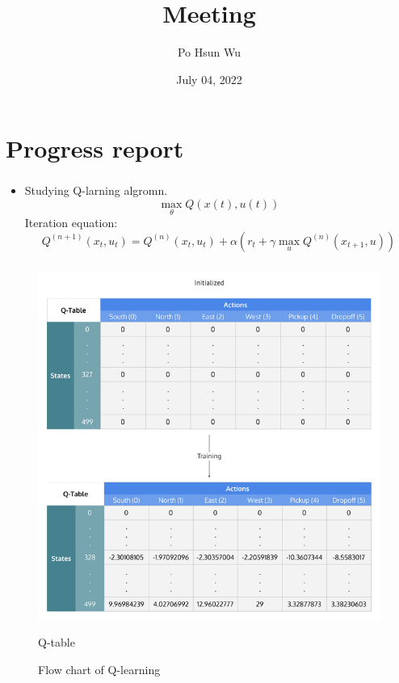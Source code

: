 \documentclass{beamer}
\date{July 04, 2022}
\title{Meeting}
\author{Po Hsun Wu}
\begin{document}
    \maketitle

    \section*{Progress report}
    \begin{frame}
        \frametitle{\secname}

        \begin{itemize}
            \item Studying Q-larning algromn.
            $$\max_{\theta} Q(x(t), u(t))$$
            Iteration equation:
            $$Q^{(n+1)}(x_t, u_t) = Q^{(n)}(x_t, u_t) + \alpha(r_t + \gamma\max_{u}Q^{(n)}(x_{t+1}, u))$$

        \end{itemize}

    \end{frame}

    \begin{frame}
        \frametitle{\secname}

        \begin{figure}
            \begin{multicols}{2}
                \includegraphics[scale=.25]{./Figs/Qtable.png}
                \caption{Q-table}

                \columnbreak
                
                \caption{Flow chart of Q-learning}
            \end{multicols}
        \end{figure}

    \end{frame}
\end{document}
